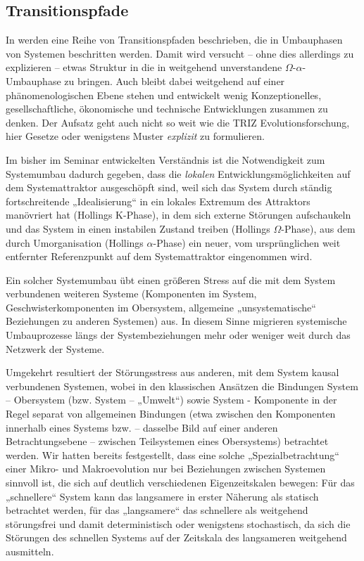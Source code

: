 \documentclass[11pt,a4paper]{article}
\begin{document}
\subsection{Transitionspfade}

In \cite{Geels2007} werden eine Reihe von Transitionspfaden beschrieben, die
in Umbauphasen von Systemen beschritten werden. Damit wird versucht -- ohne
dies allerdings zu explizieren -- etwas Struktur in die in \cite{Holling2000}
weitgehend unverstandene $\Omega$-$\alpha$-Umbauphase zu bringen. Auch
\cite{Geels2007} bleibt dabei weitgehend auf einer phänomenologischen Ebene
stehen und entwickelt wenig Konzeptionelles, gesellschaftliche, ökonomische
und technische Entwicklungen zusammen zu denken. Der Aufsatz geht auch nicht
so weit wie die TRIZ Evolutionsforschung, hier Gesetze oder wenigstens Muster
\emph{explizit} zu formulieren.

Im bisher im Seminar entwickelten Verständnis ist die Notwendigkeit zum
Systemumbau dadurch gegeben, dass die \emph{lokalen} Entwicklungsmöglichkeiten
auf dem Systemattraktor ausgeschöpft sind, weil sich das System durch ständig
fortschreitende „Idealisierung“ in ein lokales Extremum des Attraktors
manövriert hat (Hollings K-Phase), in dem sich externe Störungen aufschaukeln
und das System in einen instabilen Zustand treiben (Hollings $\Omega$-Phase),
aus dem durch Umorganisation (Hollings $\alpha$-Phase) ein neuer, vom
ursprünglichen weit entfernter Referenzpunkt auf dem Systemattraktor
eingenommen wird.

Ein solcher Systemumbau übt einen größeren Stress auf die mit dem System
verbundenen weiteren Systeme (Komponenten im System, Geschwisterkomponenten im
Obersystem, allgemeine „unsystematische“ Beziehungen zu anderen Systemen) aus.
In diesem Sinne migrieren systemische Umbauprozesse längs der
Systembeziehungen mehr oder weniger weit durch das Netzwerk der Systeme.

Umgekehrt resultiert der Störungsstress aus anderen, mit dem System kausal
verbundenen Systemen, wobei in den klassischen Ansätzen die Bindungen System
-- Obersystem (bzw. System -- „Umwelt“) sowie System - Komponente in der Regel
separat von allgemeinen Bindungen (etwa zwischen den Komponenten innerhalb
eines Systems bzw. -- dasselbe Bild auf einer anderen Betrachtungsebene --
zwischen Teilsystemen eines Obersystems) betrachtet werden. Wir hatten bereits
festgestellt, dass eine solche „Spezialbetrachtung“ einer Mikro- und
Makroevolution nur bei Beziehungen zwischen Systemen sinnvoll ist, die sich
auf deutlich verschiedenen Eigenzeitskalen bewegen: Für das „schnellere“
System kann das langsamere in erster Näherung als statisch betrachtet werden,
für das „langsamere“ das schnellere als weitgehend störungsfrei und damit
deterministisch oder wenigstens stochastisch, da sich die Störungen des
schnellen Systems auf der Zeitskala des langsameren weitgehend ausmitteln.
\end{document}
